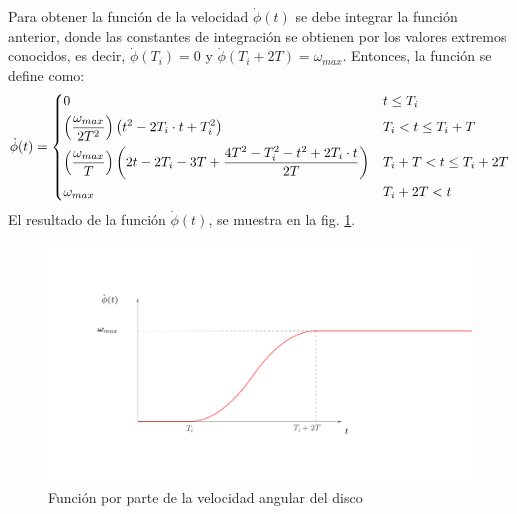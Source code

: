 Para obtener la función de la velocidad $\dot{\phi}(t)$ se debe integrar la función anterior, donde las constantes de integración se obtienen por los valores extremos conocidos, es decir, $\dot{\phi}(T_i) = 0$ y $\dot{\phi}(T_i + 2T) = \omega_{max}$. Entonces, la función se define como:
\[ \dot{\phi}(t) =
\begin{dcases}
	0																												&	t \leq T_i \\
	\left(\frac{\omega_{max}}{2T^2}\right)\left(t^2 - 2T_i\cdot t + T_i^2\right)									&	T_i < t \leq T_i + T\\
	\left(\frac{\omega_{max}}{T}\right)\left(2t - 2T_i - 3T + \frac{4T^2 - T_i^2 - t^2 + 2T_i\cdot t}{2T}\right)	&	T_i + T < t \leq T_i + 2T\\
	\omega_{max}																									&	T_i + 2T < t\\
\end{dcases} 
\]
El resultado de la función $\dot{\phi}(t)$, se muestra en la fig. \ref{fig:anglep}.
\begin{figure}[h]
\centering
\includegraphics[width=0.85\linewidth, trim={7cm 5cm 15cm 6cm},clip]{Imagenes/anglep_function.pdf}
\caption{Función por parte de la velocidad angular del disco}
\label{fig:anglep}
\end{figure}

